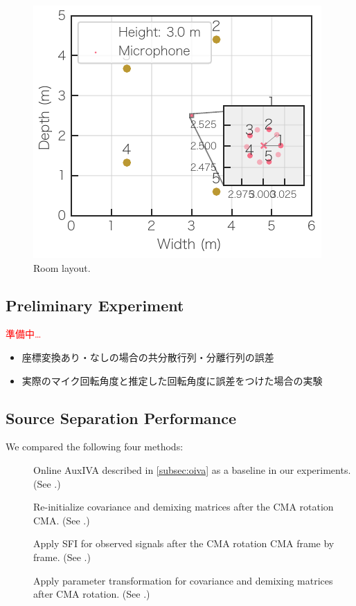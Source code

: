 \documentclass[sip,biber]{now-journal}
\newcommand{\todo}[1]{\textcolor{red}{#1}}
\begin{document}
\begin{figure}[t]
  \centering
  \includegraphics{figures/room_layout.pdf}
  \caption{Room layout.}%
  \label{fig:layout}
\end{figure}

\subsection{Preliminary Experiment}
\todo{準備中…}
\begin{itemize}
  \color{red}
  \item 座標変換あり・なしの場合の共分散行列・分離行列の誤差
  \item 実際のマイク回転角度と推定した回転角度に誤差をつけた場合の実験
\end{itemize}

\subsection{Source Separation Performance}

We compared the following four methods:
\begin{description}
  \item[\NaiveIVA] Online AuxIVA described in \cref{subsec:oiva} as a baseline in our experiments. (See .)
  \item[\ResetIVA] Re-initialize covariance and demixing matrices after the CMA rotation CMA. (See .)
  \item[\RTObs] Apply SFI for observed signals after the CMA rotation CMA frame by frame. (See .)
  \item[\RTCov] Apply parameter transformation for covariance and demixing matrices after CMA rotation.  (See .)
\end{description}
\end{document}
